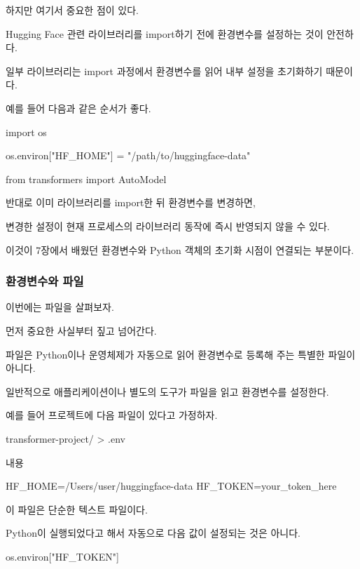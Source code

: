 하지만 여기서 중요한 점이 있다.

Hugging Face 관련 라이브러리를 import하기 전에 환경변수를 설정하는 것이 안전하다.

일부 라이브러리는 import 과정에서 환경변수를 읽어 내부 설정을 초기화하기 때문이다.

예를 들어 다음과 같은 순서가 좋다.

\begin{dhkcode}
import os

os.environ["HF_HOME"] = "/path/to/huggingface-data"

from transformers import AutoModel
\end{dhkcode}

반대로 이미 라이브러리를 import한 뒤 환경변수를 변경하면,

변경한 설정이 현재 프로세스의 라이브러리 동작에 즉시 반영되지 않을 수 있다.

이것이 7장에서 배웠던 환경변수와 Python 객체의 초기화 시점이 연결되는 부분이다.

\subsubsection{환경변수와  파일}

이번에는  파일을 살펴보자.

먼저 중요한 사실부터 짚고 넘어간다.

 파일은 Python이나 운영체제가 자동으로 읽어 환경변수로 등록해 주는 특별한 파일이 아니다.

일반적으로 애플리케이션이나 별도의 도구가  파일을 읽고 환경변수를 설정한다.

예를 들어 프로젝트에 다음 파일이 있다고 가정하자.

\begin{dhkdir}[in=6]
transformer-project/
> .env
\end{dhkdir}

내용

\begin{dhkzsh}
HF_HOME=/Users/user/huggingface-data
HF_TOKEN=your_token_here
\end{dhkzsh}

이 파일은 단순한 텍스트 파일이다.

Python이 실행되었다고 해서 자동으로 다음 값이 설정되는 것은 아니다.

\begin{dhkcode}
os.environ["HF_TOKEN"]
\end{dhkcode}

